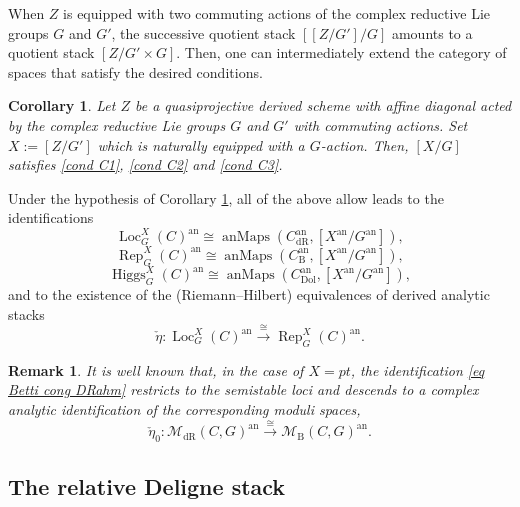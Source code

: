 \documentclass[11pt, a4paper]{amsart}
\numberwithin{equation}{section}
\newtheorem{corollary}[theorem]{Corollary}
\newtheorem{remark}[theorem]{Remark}
\theoremstyle{definition}
\theoremstyle{remark}
\DeclareMathOperator{\Higgs}{Higgs}
\DeclareMathOperator{\anMaps}{anMaps}
\DeclareMathOperator{\an}{an}
\DeclareMathOperator{\Loc}{Loc}
\DeclareMathOperator{\Rep}{Rep}
\DeclareMathOperator{\Dol}{Dol}
\DeclareMathOperator{\dR}{dR}
\newcommand{\Mm}{\mathcal{M}}
\newcommand{\B}{\mathrm{B}}
\renewcommand{\to}{\longrightarrow}
\begin{document}
When $Z$ is equipped with two commuting actions of the complex reductive Lie groups $G$ and $G'$, the successive quotient stack $[[Z/G']/G]$ amounts to a quotient stack $[Z / G' \times G]$. Then, one can intermediately extend the category of spaces that satisfy the desired conditions.

\begin{corollary}\label{co conditions for [X/H]}
Let $Z$ be a quasiprojective derived scheme with affine diagonal acted by the complex reductive Lie groups $G$ and $G'$ with commuting actions. Set $X := [Z/G']$ which is naturally equipped with a $G$-action. Then, $[X/G]$ satisfies \ref{cond C1}, \ref{cond C2} and \ref{cond C3}.
\end{corollary}

Under the hypothesis of Corollary \ref{co conditions for [X/H]}, all of the above allow leads to the identifications
\[
\Loc_{G}^{X}(C)^{\an} \cong \anMaps(C^{\an}_{\dR}, [X^{\an}/G^{\an}]),
\]
\[
\Rep_{G}^{X}(C)^{\an} \cong \anMaps(C^{\an}_{\B}, [X^{\an}/G^{\an}]),
\]
\[
\Higgs_{G}^{X}(C)^{\an} \cong \anMaps(C^{\an}_{\Dol}, [X^{\an}/G^{\an}]),
\]
and to the existence of the (Riemann--Hilbert) equivalences of derived analytic stacks
\begin{equation}\label{eq Betti cong DRahm}
\check{\eta} : \Loc_G^X(C)^{\an} \stackrel{\cong}{\to} \Rep_G^X(C)^{\an}.
\end{equation}

\begin{remark} \label{rm Betti cong DRahm moduli space}
It is well known that, in the case of $X = pt$, the identification \eqref{eq Betti cong DRahm} restricts to the semistable loci and descends to a complex analytic identification of the corresponding moduli spaces,
\[%
\check{\eta}_0 : \Mm_{\dR}(C,G)^{\an} \stackrel{\cong}{\to} \Mm_{\B}(C,G)^{\an}.
\]%
\end{remark}




\subsection{The relative Deligne stack}
\end{document}

